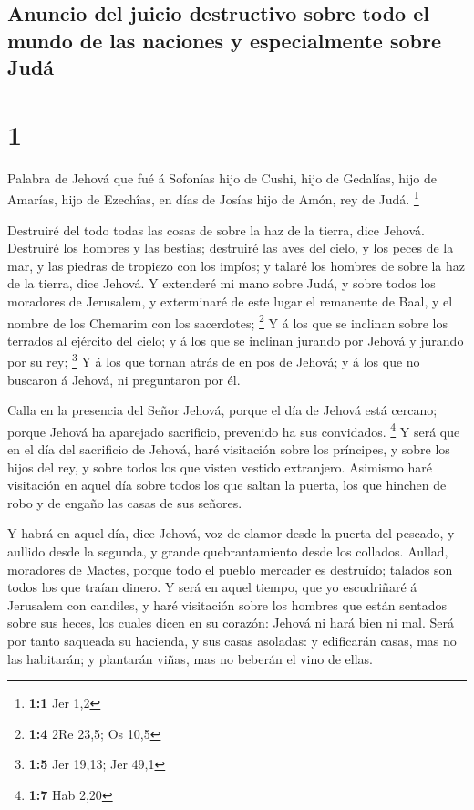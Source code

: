 \hypertarget{anuncio-del-juicio-destructivo-sobre-todo-el-mundo-de-las-naciones-y-especialmente-sobre-juduxe1}{%
\subsection{Anuncio del juicio destructivo sobre todo el mundo de las
naciones y especialmente sobre
Judá}\label{anuncio-del-juicio-destructivo-sobre-todo-el-mundo-de-las-naciones-y-especialmente-sobre-juduxe1}}

\hypertarget{section}{%
\section{1}\label{section}}

 Palabra de Jehová que fué á Sofonías hijo de Cushi, hijo de
Gedalías, hijo de Amarías, hijo de Ezechîas, en días de Josías hijo de
Amón, rey de Judá. \footnote{\textbf{1:1} Jer 1,2}

 Destruiré del todo todas las cosas de sobre la haz de la
tierra, dice Jehová.  Destruiré los hombres y las bestias;
destruiré las aves del cielo, y los peces de la mar, y las piedras de
tropiezo con los impíos; y talaré los hombres de sobre la haz de la
tierra, dice Jehová.  Y extenderé mi mano sobre Judá, y
sobre todos los moradores de Jerusalem, y exterminaré de este lugar el
remanente de Baal, y el nombre de los Chemarim con los sacerdotes;
\footnote{\textbf{1:4} 2Re 23,5; Os 10,5}  Y á los que se
inclinan sobre los terrados al ejército del cielo; y á los que se
inclinan jurando por Jehová y jurando por su rey; \footnote{\textbf{1:5}
  Jer 19,13; Jer 49,1}  Y á los que tornan atrás de en pos
de Jehová; y á los que no buscaron á Jehová, ni preguntaron por él.

 Calla en la presencia del Señor Jehová, porque el día de
Jehová está cercano; porque Jehová ha aparejado sacrificio, prevenido ha
sus convidados. \footnote{\textbf{1:7} Hab 2,20}  Y será que
en el día del sacrificio de Jehová, haré visitación sobre los príncipes,
y sobre los hijos del rey, y sobre todos los que visten vestido
extranjero.  Asimismo haré visitación en aquel día sobre
todos los que saltan la puerta, los que hinchen de robo y de engaño las
casas de sus señores.

 Y habrá en aquel día, dice Jehová, voz de clamor desde la
puerta del pescado, y aullido desde la segunda, y grande quebrantamiento
desde los collados.  Aullad, moradores de Mactes, porque
todo el pueblo mercader es destruído; talados son todos los que traían
dinero.  Y será en aquel tiempo, que yo escudriñaré á
Jerusalem con candiles, y haré visitación sobre los hombres que están
sentados sobre sus heces, los cuales dicen en su corazón: Jehová ni hará
bien ni mal.  Será por tanto saqueada su hacienda, y sus
casas asoladas: y edificarán casas, mas no las habitarán; y plantarán
viñas, mas no beberán el vino de ellas.

